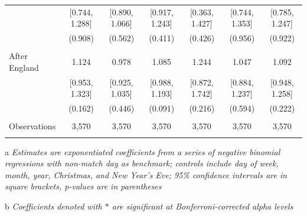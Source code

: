 \documentclass[12pt, a4paper]{article}
\begin{document}
\begin{table}
{\begin{threeparttable}
\begin{tabular}{@{\extracolsep{1pt}}lcccccc}
  & [0.744, 1.288] & [0.890, 1.066] & [0.917, 1.243] & [0.363, 1.427] & [0.744, 1.353] & [0.785, 1.247] \\ 
  & (0.908) & (0.562) & (0.411) & (0.426) & (0.956) & (0.922) \\ 
  & & & & & & \\ 
 After England & 1.124 & 0.978 & 1.085 & 1.244 & 1.047 & 1.092 \\ 
  & [0.953, 1.323] & [0.925, 1.035] & [0.988, 1.193] & [0.872, 1.742] & [0.884, 1.237] & [0.948, 1.258] \\ 
  & (0.162) & (0.446) & (0.091) & (0.216) & (0.594) & (0.222) \\ 


\hline \\[-1.8ex] 
Observations & 3,570 & 3,570 & 3,570 & 3,570 & 3,570 & 3,570 \\ 
\hline 
\hline \\[-1.8ex] 
\end{tabular} 
\begin{tablenotes}
      \item[a] \textit{Estimates are exponentiated coefficients from a series of negative binomial regressions with non-match day as benchmark; controls include day of week, month, year, Christmas, and New Year's Eve; 95\% confidence intervals are in square brackets, p-values are in parentheses}
       \item[b] \textit{Coefficients denoted with $*$ are significant at Bonferroni-corrected alpha levels}
    \end{tablenotes}
\end{threeparttable} }
\end{table}



\end{document}
